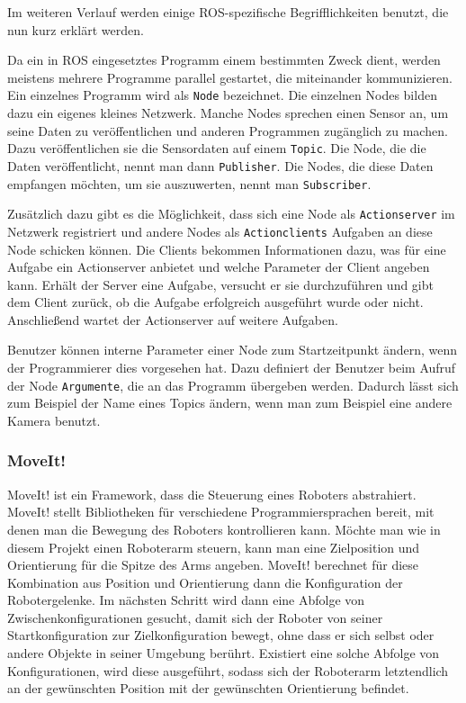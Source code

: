 Im weiteren Verlauf werden einige ROS-spezifische Begrifflichkeiten benutzt, die nun kurz erklärt werden.

Da ein in ROS eingesetztes Programm einem bestimmten Zweck dient, werden meistens mehrere Programme parallel gestartet, die miteinander kommunizieren. Ein einzelnes Programm wird als \texttt{Node} bezeichnet. Die einzelnen Nodes bilden dazu ein eigenes kleines Netzwerk. Manche Nodes sprechen einen Sensor an, um seine Daten zu veröffentlichen und anderen Programmen zugänglich zu machen. Dazu veröffentlichen sie die Sensordaten auf einem \texttt{Topic}. Die Node, die die Daten veröffentlicht, nennt man dann \texttt{Publisher}. Die Nodes, die diese Daten empfangen möchten, um sie auszuwerten, nennt man \texttt{Subscriber}. 

Zusätzlich dazu gibt es die Möglichkeit, dass sich eine Node als \texttt{Actionserver} im Netzwerk registriert und andere Nodes als \texttt{Actionclients} Aufgaben an diese Node schicken können. Die Clients bekommen Informationen dazu, was für eine Aufgabe ein Actionserver anbietet und welche Parameter der Client angeben kann. Erhält der Server eine Aufgabe, versucht er sie durchzuführen und gibt dem Client zurück, ob die Aufgabe erfolgreich ausgeführt wurde oder nicht. Anschließend wartet der Actionserver auf weitere Aufgaben.

Benutzer können interne Parameter einer Node zum Startzeitpunkt ändern, wenn der Programmierer dies vorgesehen hat. Dazu definiert der Benutzer beim Aufruf der Node \texttt{Argumente}, die an das Programm übergeben werden. Dadurch lässt sich zum Beispiel der Name eines Topics ändern, wenn man zum Beispiel eine andere Kamera benutzt. 

\subsubsection{MoveIt!} %
\label{ssub:moveit}
MoveIt! \cite{MoveIt} ist ein Framework, dass die Steuerung eines Roboters abstrahiert. MoveIt! stellt Bibliotheken für verschiedene Programmiersprachen bereit, mit denen man die Bewegung des Roboters kontrollieren kann. Möchte man wie in diesem Projekt einen Roboterarm steuern, kann man eine Zielposition und Orientierung für die Spitze des Arms angeben. MoveIt! berechnet für diese Kombination aus Position und Orientierung dann die Konfiguration der Robotergelenke. Im nächsten Schritt wird dann eine Abfolge von Zwischenkonfigurationen gesucht, damit sich der Roboter von seiner Startkonfiguration zur Zielkonfiguration bewegt, ohne dass er sich selbst oder andere Objekte in seiner Umgebung berührt. Existiert eine solche Abfolge von Konfigurationen, wird diese ausgeführt, sodass sich der Roboterarm letztendlich an der gewünschten Position mit der gewünschten Orientierung befindet.

